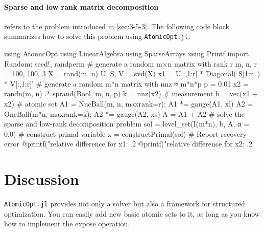 \paragraph{Sparse and low rank matrix decomposition} refers to the problem introduced in \autoref{sec:3-5-3}. The following code block summarizes how to solve this problem using \texttt{AtomicOpt.jl}.
\begin{code}
  using AtomicOpt
  using LinearAlgebra
  using SparseArrays
  using Printf
  import Random: seed!, randperm
  # generate a random m×n matrix with rank r
  m, n, r = 100, 100, 3 
  X = rand(m, n)
  U, S, V = svd(X)
  x1 = U[:,1:r] * Diagonal( S[1:r] ) * V[:,1:r]'
  # generate a random m*n matrix with nnz ≈ m*n*p
  p = 0.01
  x2 = randn(m, n) .* sprand(Bool, m, n, p)
  k = nnz(x2)
  # measurement
  b = vec(x1 + x2)
  # atomic set
  A1 = NucBall(m, n, maxrank=r); A1 *= gauge(A1, xl)
  A2 = OneBall(m*n, maxrank=k); A2 *= gauge(A2, xs)
  A = A1 + A2
  # solve the sparse and low-rank decomposition problem
  sol = level_set(I(m*n), b, A, α = 0.0)
  # construct primal variable
  x = constructPrimal(sol)
  # Report recovery error
  @printf("relative difference for x1: .2%
  @printf("relative difference for x2: .2%
\end{code}


\section{Discussion} \label{sec:5-5} 
\texttt{AtomicOpt.jl} provides not only a solver but also a framework for structured optimization. You can easily add new basic atomic sets to it, as long as you know how to implement the expose operation. 








